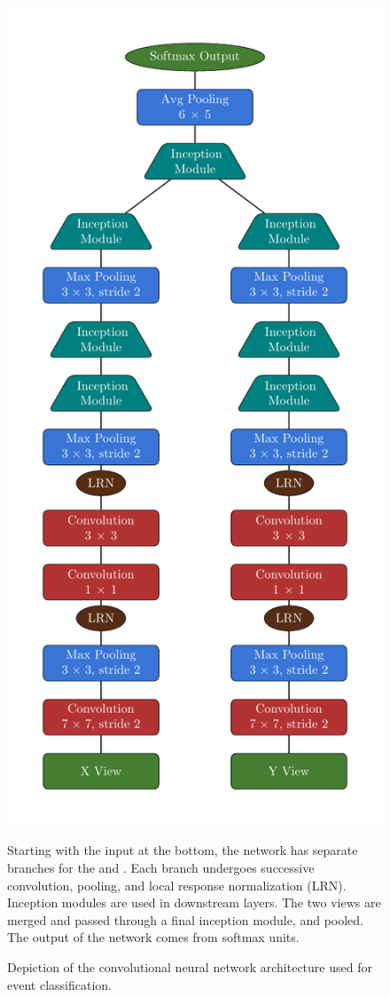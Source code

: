 \begin{figure}[t]
\begin{center}
\includegraphics[height=0.9\textheight]{figures/arch/arch.pdf}
\end{center}
\caption{Depiction of the convolutional neural network architecture used
for event classification.}{Starting with the input at the bottom,
the network has separate branches for the \xview and \yview.
Each branch undergoes successive convolution, pooling, and
local response normalization (LRN).  Inception modules are used in downstream layers.
The two views are merged and passed through a final inception module, and
pooled.  The output of the network comes from softmax units.
}
\label{arch}
\end{figure}


